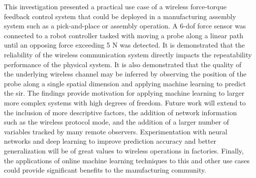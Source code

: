 This investigation presented a practical use case of a wireless force-torque feedback control system that could be deployed in a manufacturing assembly system such as a pick-and-place or assembly operation.  A 6-\gls{dof} force sensor was connected to a robot controller tasked with moving a probe along a linear path until an opposing force exceeding 5 N was detected.  It is demonstrated that the reliability of the wireless communication system directly impacts the repeatability performance of the physical system. It is also demonstrated that the quality of the underlying wireless channel may be inferred by observing the position of the probe along a single spatial dimension and applying machine learning to predict the \gls{sir}. The findings provide motivation for applying machine learning to larger more complex systems with high degrees of freedom. Future work will extend to the inclusion of more descriptive factors, the addition of network information such as the wireless protocol mode, and the addition of a larger number of variables tracked by many remote observers. Experimentation with neural networks and deep learning to improve prediction accuracy and better generalization will be of great values to wireless operations in factories.  Finally, the applications of online machine learning techniques to this and other use cases could provide significant benefits to the manufacturing community.



